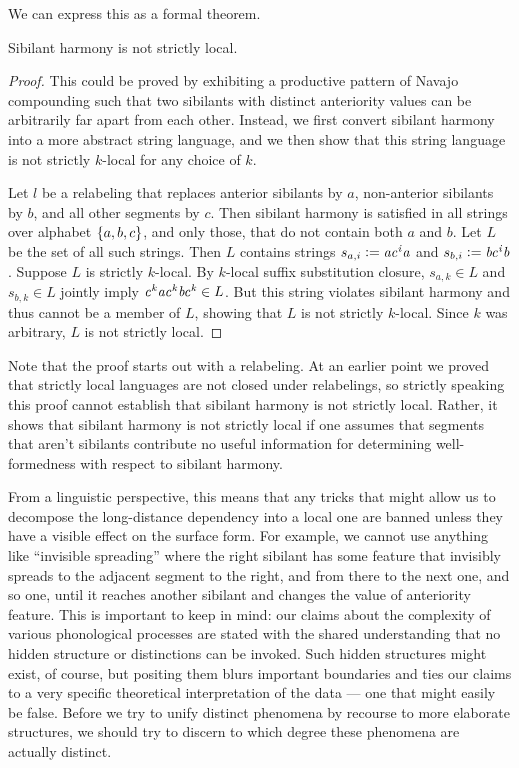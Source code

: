 We can express this as a formal theorem.
%
\begin{theorem}
    Sibilant harmony is not strictly local.
\end{theorem}
%
\begin{proof}
    This could be proved by exhibiting a productive pattern of Navajo compounding such that two sibilants with distinct anteriority values can be arbitrarily far apart from each other.
    Instead, we first convert sibilant harmony into a more abstract string language, and we then show that this string language is not strictly $k$-local for any choice of $k$.

    Let $l$ be a relabeling that replaces anterior sibilants by $a$, non-anterior sibilants by $b$, and all other segments by $c$.
    Then sibilant harmony is satisfied in all strings over alphabet $\left \{ a,b,c \right \}$, and only those, that do not contain both $a$ and $b$.
    Let $L$ be the set of all such strings.
    Then $L$ contains strings $s_{a,i} \mathrel{\mathop:}= \mathit{a c^i a}$ and $s_{b,i} \mathrel{\mathop:}= \mathit{b c^i b}$.
    Suppose $L$ is strictly $k$-local.
    By $k$-local suffix substitution closure, $s_{a,k} \in L$ and $s_{b,k} \in L$ jointly imply $\mathit{c^k a c^k b c^k} \in L$.
    But this string violates sibilant harmony and thus cannot be a member of $L$, showing that $L$ is not strictly $k$-local.
    Since $k$ was arbitrary, $L$ is not strictly local.
\end{proof}

Note that the proof starts out with a relabeling.
At an earlier point we proved that strictly local languages are not closed under relabelings, so strictly speaking this proof cannot establish that sibilant harmony is not strictly local.
Rather, it shows that sibilant harmony is not strictly local if one assumes that segments that aren't sibilants contribute no useful information for determining well-formedness with respect to sibilant harmony.

From a linguistic perspective, this means that any tricks that might allow us to decompose the long-distance dependency into a local one are banned unless they have a visible effect on the surface form.
For example, we cannot use anything like ``invisible spreading'' where the right sibilant has some feature that invisibly spreads to the adjacent segment to the right, and from there to the next one, and so one, until it reaches another sibilant and changes the value of anteriority feature.
This is important to keep in mind: our claims about the complexity of various phonological processes are stated with the shared understanding that no hidden structure or distinctions can be invoked.
Such hidden structures might exist, of course, but positing them blurs important boundaries and ties our claims to a very specific theoretical interpretation of the data --- one that might easily be false.
Before we try to unify distinct phenomena by recourse to more elaborate structures, we should try to discern to which degree these phenomena are actually distinct.

